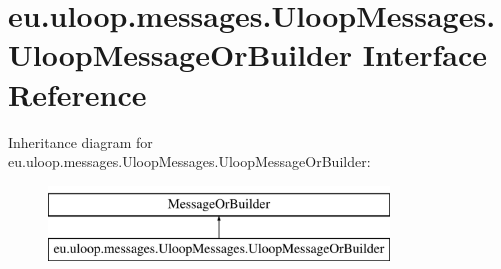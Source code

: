\hypertarget{interfaceeu_1_1uloop_1_1messages_1_1UloopMessages_1_1UloopMessageOrBuilder}{\section{eu.\+uloop.\+messages.\+Uloop\+Messages.\+Uloop\+Message\+Or\+Builder Interface Reference}
\label{interfaceeu_1_1uloop_1_1messages_1_1UloopMessages_1_1UloopMessageOrBuilder}
}
Inheritance diagram for eu.\+uloop.\+messages.\+Uloop\+Messages.\+Uloop\+Message\+Or\+Builder\+:\begin{figure}[H]
\begin{center}
\leavevmode
\includegraphics[height=2.000000cm]{interfaceeu_1_1uloop_1_1messages_1_1UloopMessages_1_1UloopMessageOrBuilder}
\end{center}
\end{figure}
